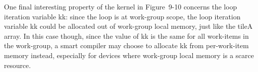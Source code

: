 One final interesting property of the kernel in Figure 9-10 concerns the loop iteration variable kk: since the loop is at work-group scope, the loop iteration variable kk could be allocated out of work-group local memory, just like the tileA array. In this case though, since the value of kk is the same for all work-items in the work-group, a smart compiler may choose to allocate kk from per-work-item memory instead, especially for devices where work-group local memory is a scarce resource.\par























